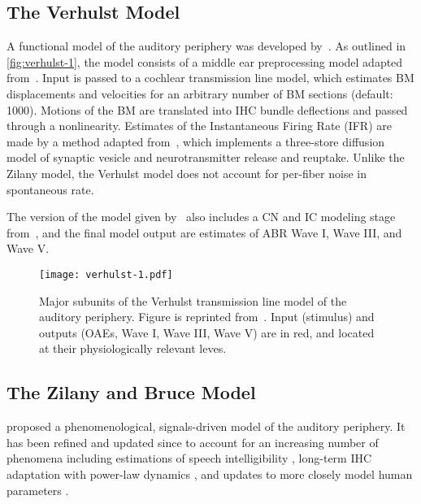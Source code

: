 \subsection{The Verhulst Model} %
\label{sub:the_verhulst_model}
A functional model of the auditory periphery was developed by~\cite{Verhulst2015Functional}.  As outlined in \autoref{fig:verhulst-1}, the model consists of a middle ear preprocessing model adapted from~\cite{Meddis2010Computational}.  Input is passed to a cochlear transmission line model, which estimates BM displacements and velocities for an arbitrary number of BM sections (default: 1000).  Motions of the BM are translated into IHC bundle deflections and passed through a nonlinearity.  Estimates of the Instantaneous Firing Rate (IFR) are made by a method adapted from~\cite{Westerman1988Diffusion}, which implements a three-store diffusion model of synaptic vesicle and neurotransmitter release and reuptake.  Unlike the Zilany model, the Verhulst model does not account for per-fiber noise in spontaneous rate.

The version of the model given by~\cite{Verhulst2015Functional} also includes a CN and IC modeling stage from~\cite{Nelson2004Phenomenological}, and the final model output are estimates of ABR Wave I, Wave III, and Wave V. 

\begin{figure}[htbp]
	\centering
	\texttt{[image: verhulst-1.pdf]}
	\caption[The Verhulst Model]{Major subunits of the Verhulst transmission line model of the auditory periphery.  Figure is reprinted from~\cite{Verhulst2015Functional}.  Input (stimulus) and outputs (OAEs, Wave I, Wave III, Wave V) are in red, and located at their physiologically relevant leves.}
	\label{fig:verhulst-1}
\end{figure}


\subsection{The Zilany and Bruce Model} %
\label{sub:the_zilany_and_bruce_model}
\cite{Zilany2006Modeling} proposed a phenomenological, signals-driven model of the auditory periphery.  It has been refined and updated since to account for an increasing number of phenomena including estimations of speech intelligibility \citep{Zilany2007Predictions}, long-term IHC adaptation with power-law dynamics \citep{Zilany2009Phenomenological}, and updates to more closely model human parameters \citep{Zilany2014Updated}.  

